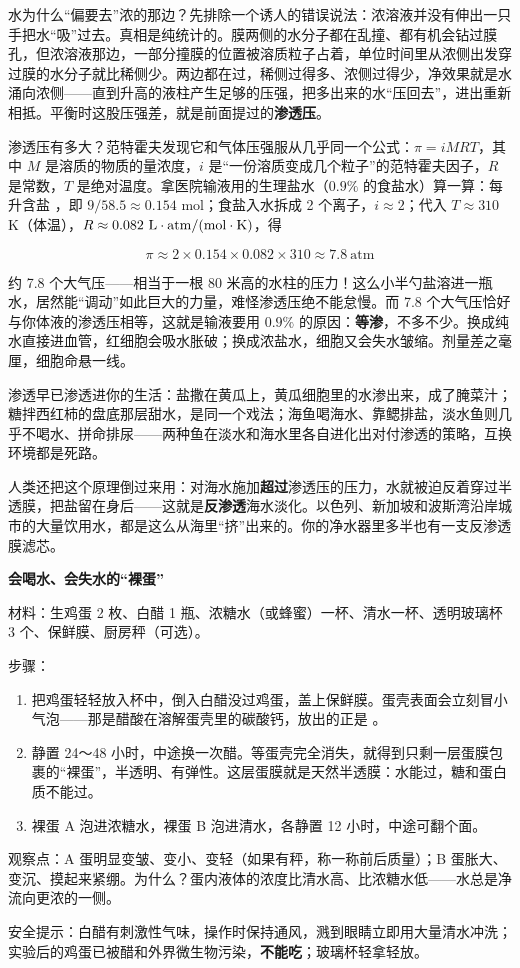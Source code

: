 水为什么“偏要去”浓的那边？先排除一个诱人的错误说法：浓溶液并没有伸出一只手把水“吸”过去。真相是纯统计的。膜两侧的水分子都在乱撞、都有机会钻过膜孔，但浓溶液那边，一部分撞膜的位置被溶质粒子占着，单位时间里从浓侧出发穿过膜的水分子就比稀侧少。两边都在过，稀侧过得多、浓侧过得少，净效果就是水涌向浓侧——直到升高的液柱产生足够的压强，把多出来的水“压回去”，进出重新相抵。平衡时这股压强差，就是前面提过的\textbf{渗透压}。

\begin{qiaoliang}
渗透压有多大？范特霍夫发现它和气体压强服从几乎同一个公式：$\pi = iMRT$，其中 $M$ 是溶质的物质的量浓度，$i$ 是“一份溶质变成几个粒子”的范特霍夫因子，$R$ 是常数，$T$ 是绝对温度。拿医院输液用的生理盐水（$0.9\%$ 的食盐水）算一算：每升含盐 ，即 $9/58.5\approx 0.154$ mol；食盐入水拆成 2 个离子，$i\approx 2$；代入 $T\approx 310$ K（体温），$R\approx 0.082\ \mathrm{L\cdot atm/(mol\cdot K)}$，得

\[\pi \approx 2\times 0.154\times 0.082\times 310 \approx 7.8\ \mathrm{atm}\]

约 7.8 个大气压——相当于一根 80 米高的水柱的压力！这么小半勺盐溶进一瓶水，居然能“调动”如此巨大的力量，难怪渗透压绝不能怠慢。而 7.8 个大气压恰好与你体液的渗透压相等，这就是输液要用 $0.9\%$ 的原因：\textbf{等渗}，不多不少。换成纯水直接进血管，红细胞会吸水胀破；换成浓盐水，细胞又会失水皱缩。剂量差之毫厘，细胞命悬一线。
\end{qiaoliang}

渗透早已渗透进你的生活：盐撒在黄瓜上，黄瓜细胞里的水渗出来，成了腌菜汁；糖拌西红柿的盘底那层甜水，是同一个戏法；海鱼喝海水、靠鳃排盐，淡水鱼则几乎不喝水、拼命排尿——两种鱼在淡水和海水里各自进化出对付渗透的策略，互换环境都是死路。

人类还把这个原理倒过来用：对海水施加\textbf{超过}渗透压的压力，水就被迫反着穿过半透膜，把盐留在身后——这就是\textbf{反渗透}海水淡化。以色列、新加坡和波斯湾沿岸城市的大量饮用水，都是这么从海里“挤”出来的。你的净水器里多半也有一支反渗透膜滤芯。

\begin{shiyan}
\textbf{会喝水、会失水的“裸蛋”}

材料：生鸡蛋 2 枚、白醋 1 瓶、浓糖水（或蜂蜜）一杯、清水一杯、透明玻璃杯 3 个、保鲜膜、厨房秤（可选）。

步骤：
\begin{enumerate}[itemsep=2pt]
\item 把鸡蛋轻轻放入杯中，倒入白醋没过鸡蛋，盖上保鲜膜。蛋壳表面会立刻冒小气泡——那是醋酸在溶解蛋壳里的碳酸钙，放出的正是 。
\item 静置 24～48 小时，中途换一次醋。等蛋壳完全消失，就得到只剩一层蛋膜包裹的“裸蛋”，半透明、有弹性。这层蛋膜就是天然半透膜：水能过，糖和蛋白质不能过。
\item 裸蛋 A 泡进浓糖水，裸蛋 B 泡进清水，各静置 12 小时，中途可翻个面。
\end{enumerate}

观察点：A 蛋明显变皱、变小、变轻（如果有秤，称一称前后质量）；B 蛋胀大、变沉、摸起来紧绷。为什么？蛋内液体的浓度比清水高、比浓糖水低——水总是净流向更浓的一侧。

安全提示：白醋有刺激性气味，操作时保持通风，溅到眼睛立即用大量清水冲洗；实验后的鸡蛋已被醋和外界微生物污染，\textbf{不能吃}；玻璃杯轻拿轻放。
\end{shiyan}

